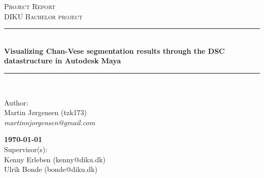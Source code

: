 \documentclass[10pt]{article}
\newcommand{\HRule}{\rule{\linewidth}{0.5mm}}
\begin{document}
\begin{titlepage}

\begin{center}

\textsc{\LARGE Project Report}\\[1.5cm]

\textsc{\Large DIKU Bachelor project}\\[0.5cm]

\HRule \\[0.4cm]

{ \bfseries Visualizing Chan-Vese segmentation results through the DSC datastructure in Autodesk Maya }\\[1cm]

\HRule \\ [7.5cm]

\begin{minipage}{0.5\textwidth}
\begin{flushleft} \large
Author:\\
Martin Jørgensen (tzk173)\\
\textit{martinnjorgensen@gmail.com}\\
\vspace{0.5cm}
\end{flushleft}
\end{minipage}
\begin{minipage}{0.4\textwidth}
\begin{flushright} {\large
\textbf{\today} }\\
Supervisor(s):\\
Kenny Erleben (kenny@diku.dk)\\
Ulrik Bonde (bonde@diku.dk)
\end{flushright}
\end{minipage}

\vfill



\end{center}

\end{titlepage}
\clearpage


\newpage
\tableofcontents
\newpage








\end{document}
